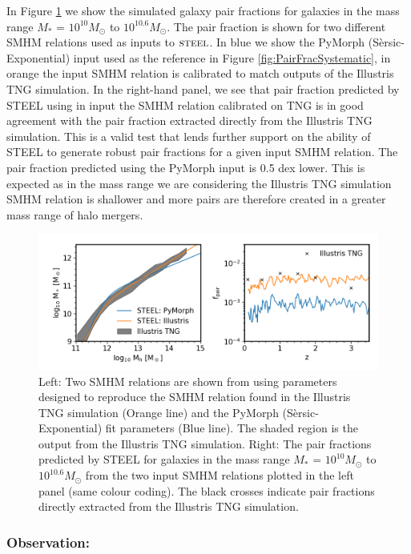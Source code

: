 In Figure \ref{fig:PairFractionIll} we show the simulated galaxy pair fractions for galaxies in the mass range $M_*$ = $10^{10}M_{\odot}$ to $10^{10.6}M_{\odot}$. The pair fraction is shown for two different SMHM relations used as inputs to $\textsc{steel}$. In blue we show the PyMorph (S\`ersic-Exponential) input used as the reference in Figure \ref{fig:PairFracSystematic}, in orange the input SMHM relation is calibrated to match outputs of the Illustris TNG simulation. In the right-hand panel, we see that pair fraction predicted by STEEL using in input the SMHM relation calibrated on TNG is in good agreement with the pair fraction extracted directly from the Illustris TNG simulation. This is a valid test that lends further support on the ability of STEEL to generate robust pair fractions for a given input SMHM relation. The pair fraction predicted using the PyMorph input is 0.5 dex lower. This is expected as in the mass range we are considering the Illustris TNG simulation SMHM relation is shallower and more pairs are therefore created in a greater mass range of halo mergers. 
\begin{figure}
    \centering
    \includegraphics[width = \linewidth]{Figures/Chapter5/PairFractionIllustris.png}
    \caption{Left: Two SMHM relations are shown from \steel using parameters designed to reproduce the SMHM relation found in the Illustris TNG simulation (Orange line) and the PyMorph (S\`ersic-Exponential) fit parameters (Blue line). The shaded region is the output from the Illustris TNG simulation. Right: The pair fractions predicted by STEEL for galaxies in the mass range  $M_*$ = $10^{10}M_{\odot}$ to $10^{10.6}M_{\odot}$  from the two input SMHM relations plotted in the left panel (same colour coding). The black crosses indicate pair fractions directly extracted from the Illustris TNG simulation.}
    \label{fig:PairFractionIll}
\end{figure}

\subsubsection{Observation: \citet{Mundy2017A3.5}}

